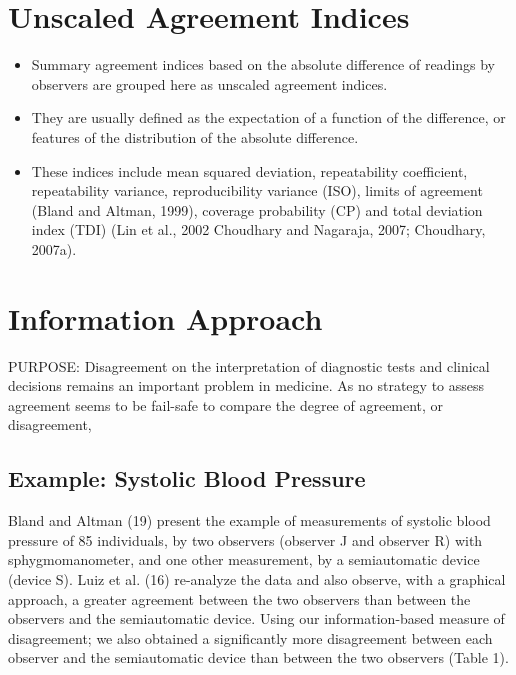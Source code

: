 \documentclass[12pt, a4paper]{report}
\theoremstyle{plain}
\theoremstyle{definition}
\theoremstyle{remark}
\begin{document}



	\section{Unscaled Agreement Indices}
	\begin{itemize}
		\item Summary agreement indices based on the absolute difference of readings by observers are
		grouped here as unscaled agreement indices. 
		\item They are usually defined as the expectation
		of a function of the difference, or features of the distribution of the absolute difference.
		
		\item
		These indices include mean squared deviation, repeatability coefficient, repeatability variance,
		reproducibility variance (ISO), limits of agreement (Bland and Altman, 1999), coverage
		probability (CP) and total deviation index (TDI) (Lin et al., 2002 Choudhary and Nagaraja,
		2007; Choudhary, 2007a).
	\end{itemize}
	
	
	\section{Information Approach}
	
	PURPOSE: Disagreement on the interpretation of diagnostic tests and clinical decisions 
	remains an important problem in medicine. As no strategy to assess agreement seems to be 
	fail-safe to compare the degree of agreement, or disagreement, 
	
	
	
	\subsection{Example: Systolic Blood Pressure}
	Bland and Altman (19) present the example of measurements of systolic blood pressure of 85 individuals, by two observers (observer J and observer R) with sphygmomanometer, and one other measurement, by a semiautomatic device (device S). Luiz et al. (16) re-analyze the data and also observe, with a graphical approach, a greater agreement between the two observers than between the observers and the semiautomatic device. Using our information-based measure of disagreement; we also obtained a significantly more
	disagreement between each observer and the semiautomatic device than between the two observers (Table 1).
	
\end{document}
